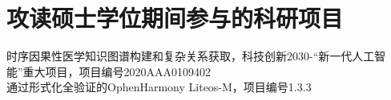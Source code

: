 \chapter{攻读硕士学位期间参与的科研项目}
\noindent [1] 时序因果性医学知识图谱构建和复杂关系获取，科技创新2030-“新一代人工智能”重大项目，项目编号2020AAA0109402\\
\noident [2] 通过形式化全验证的OphenHarmony Liteos-M，项目编号1.3.3
